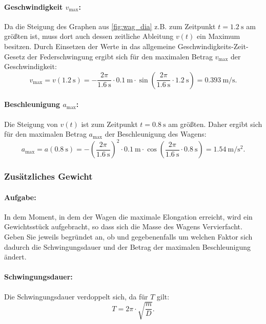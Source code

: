 \documentclass{ajc}
\begin{document}
	\paragraph{Geschwindigkeit $v_\text{max}$:} Da die Steigung des Graphen aus \ref{fig:wag_dia} z.B. zum Zeitpunkt $t = \SI{1.2}{\s}$ am größten ist, muss dort auch dessen zeitliche Ableitung $v(t)$ ein Maximum besitzen. Durch Einsetzen der Werte in das allgemeine Geschwindigkeits-Zeit-Gesetz der Federschwingung ergibt sich für den maximalen Betrag $v_\text{max}$ der Geschwindigkeit:
	\begin{equation}
		v_\text{max} = v(\SI{1.2}{\s}) = - \frac{2\pi}{\SI{1.6}{\s}} \cdot \SI{0.1}{\meter} \cdot \sin\left(\frac{2\pi}{\SI{1.6}{\s}} \cdot \SI{1.2}{\s}\right) = \SI{0.393}{\m\per\s}.
	\end{equation}
	
	\paragraph{Beschleunigung $a_\text{max}$:} Die Steigung von $v(t)$ ist zum Zeitpunkt $t = \SI{0.8}{\s}$ am größten. Daher ergibt sich für den maximalen Betrag $a_\text{max}$ der Beschleunigung des Wagens:
	\begin{equation}
		a_\text{max} = a(\SI{0.8}{\s}) = - \left(\frac{2\pi}{\SI{1.6}{\s}}\right)^2 \cdot \SI{0.1}{\meter} \cdot \cos\left(\frac{2\pi}{\SI{1.6}{\s}} \cdot \SI{0.8}{\s}\right) = \SI{1.54}{\m\per\s\squared}.
	\end{equation}
	
	\subsubsection{Zusätzliches Gewicht}
	\paragraph{Aufgabe:}In dem Moment, in dem der Wagen die maximale Elongation erreicht, wird ein Gewichtsstück aufgebracht, so dass sich die Masse des Wagens Vervierfacht. Geben Sie jeweils begründet an, ob und gegebenenfalls um welchen Faktor sich dadurch die Schwingungsdauer und der Betrag der maximalen Beschleunigung ändert.
	
	\paragraph{Schwingungsdauer:} Die Schwingungsdauer verdoppelt sich, da für $T$ gilt:
	\begin{equation}
		T = 2\pi \cdot \sqrt{\frac{m}{D}}.
	\end{equation}
	
\end{document}
